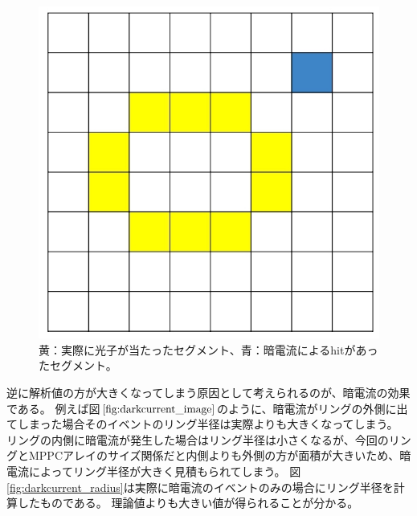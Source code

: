 \documentclass[uplatex, titlepage, dvipdfmx, 12pt, a4paper]{jsreport}
\begin{document}
    \begin{figure}[hbtp]
        \begin{center} 
          \includegraphics[scale=0.4, clip]{image/dark_current_image_page.jpg}
          \caption{黄：実際に光子が当たったセグメント、青：暗電流によるhitがあったセグメント。} 
          \label{fig:darkcurrent_image} 
        \end{center}
      \end{figure}
      逆に解析値の方が大きくなってしまう原因として考えられるのが、暗電流の効果である。
      例えば図$\ref{fig:darkcurrent_image}$のように、暗電流がリングの外側に出てしまった場合そのイベントのリング半径は実際よりも大きくなってしまう。
      リングの内側に暗電流が発生した場合はリング半径は小さくなるが、今回のリングとMPPCアレイのサイズ関係だと内側よりも外側の方が面積が大きいため、暗電流によってリング半径が大きく見積もられてしまう。
      図\ref{fig:darkcurrent_radius}は実際に暗電流のイベントのみの場合にリング半径を計算したものである。
      理論値よりも大きい値が得られることが分かる。
\end{document}
